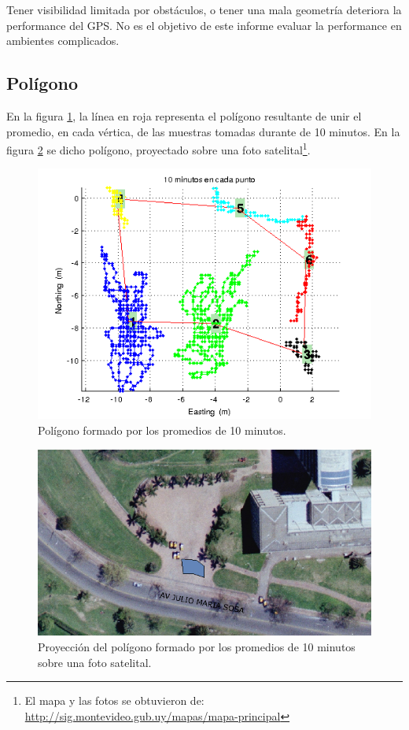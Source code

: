 \documentclass[spanish,12pt,a4paper,titlepage]{report}
\begin{document}
Tener visibilidad limitada por obstáculos, o tener una mala geometría deteriora la performance del GPS. No es el objetivo de este informe evaluar la performance en ambientes complicados.


\newpage
\subsection{Polígono}
\label{sec:gps2-poligono}

En la figura \ref{fig:10min_pol.png}, la línea en roja representa el polígono resultante de unir el promedio, en cada vértica, de las muestras tomadas durante de 10 minutos. En la figura \ref{fig:10m_mapa.png} se dicho polígono, proyectado sobre una foto satelital\footnote{El mapa y las fotos se obtuvieron de:\\ \url{http://sig.montevideo.gub.uy/mapas/mapa-principal}}.

\begin{figure}[h!]
  \centering
  \includegraphics[width=.8\textwidth]{./img/10min_pol.png}
  \caption{Polígono formado por los promedios de 10 minutos.}
  \label{fig:10min_pol.png}
\end{figure}

\begin{figure}[h!]
  \centering
  \includegraphics[width=.8\textwidth]{./img/10m_mapa.png}
  \caption{Proyección del polígono formado por los promedios de 10 minutos sobre una foto satelital.}
  \label{fig:10m_mapa.png}
\end{figure}
\end{document}

